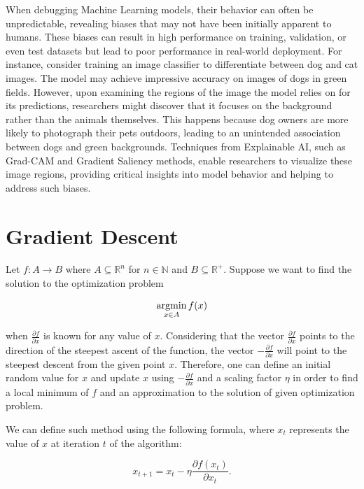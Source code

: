 When debugging Machine Learning models, their behavior can often be unpredictable, revealing biases that may not have been initially apparent to humans. 
These biases can result in high performance on training, validation, or even test datasets but lead to poor performance in real-world deployment. 
For instance, consider training an image classifier to differentiate between dog and cat images. 
The model may achieve impressive accuracy on images of dogs in green fields. 
However, upon examining the regions of the image the model relies on for its predictions, researchers might discover that it focuses on the background rather than the animals themselves. 
This happens because dog owners are more likely to photograph their pets outdoors, leading to an unintended association between dogs and green backgrounds. 
Techniques from Explainable AI, such as Grad-CAM \citep{Selvaraju_2019} and Gradient Saliency methods, enable researchers to visualize these image regions, providing critical insights into model behavior and helping to address such biases.

\section{Gradient Descent}
\label{sec:gradient_descent}

Let \(f\colon A \to B\) where \(A \subseteq \mathbb{R}^n\) for \(n \in \mathbb{N}\) and \(B \subseteq \mathbb{R^+}\). Suppose we want to find the solution to the optimization problem

\begin{equation}
    \operatorname*{argmin}_{x \in A} f(x)
    \label{eq:min_func}
\end{equation}

when \(\frac{\partial f}{\partial x}\) is known for any value of \(x\). Considering that the vector \(\frac{\partial f}{\partial x}\) points to the direction of the steepest ascent of the function, the vector \(- \frac{\partial f}{\partial x}\) will point to the steepest descent from the given point \(x\).
Therefore, one can define an initial random value for \(x\) and update \(x\) using \(- \frac{\partial f}{\partial x}\) and a scaling factor \(\eta\) in order to find a local minimum of \(f\) and an approximation to the solution of given optimization problem.

We can define such method using the following formula, where \(x_t\) represents the value of \(x\) at iteration \(t\) of the algorithm:

\begin{equation}
    x_{t + 1} = x_t - \eta \frac{\partial f (x_t)}{\partial x_t}.
    \label{eq:gradient_descent}  
\end{equation}

